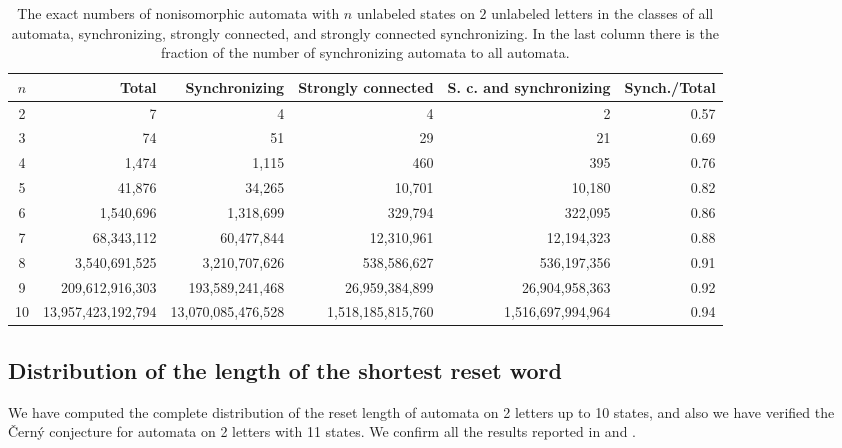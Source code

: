 \documentclass[runningheads,a4paper]{llncs}
\newcommand{\<}{\langle}
\renewcommand{\>}{\rangle}
\begin{document}
\begin{table}\label{tab:aut_counts_k2}
\centering
\caption{The exact numbers of nonisomorphic automata with $n$ unlabeled states on $2$ unlabeled letters in the classes of all automata, synchronizing, strongly connected, and strongly connected synchronizing. In the last column there is the fraction of the number of synchronizing automata to all automata.}
\begin{tabular}{|c|r|r|r|r|r|} \hline
$n$ & Total              & Synchronizing      & Strongly connected & S. c. and synchronizing & Synch./Total \\ \hline
2   &                  7 &                  4 &                  4 &                 2 & 0.57 \\ \hline
3   &                 74 &                 51 &                 29 &                21 & 0.69 \\ \hline
4   &              1,474 &              1,115 &                460 &               395 & 0.76 \\ \hline
5   &             41,876 &             34,265 &             10,701 &            10,180 & 0.82 \\ \hline
6   &          1,540,696 &          1,318,699 &            329,794 &           322,095 & 0.86 \\ \hline
7   &         68,343,112 &         60,477,844 &         12,310,961 &        12,194,323 & 0.88 \\ \hline
8   &      3,540,691,525 &      3,210,707,626 &        538,586,627 &       536,197,356 & 0.91 \\ \hline
9   &    209,612,916,303 &    193,589,241,468 &     26,959,384,899 &    26,904,958,363 & 0.92 \\ \hline
10  & 13,957,423,192,794 & 13,070,085,476,528 &  1,518,185,815,760 & 1,516,697,994,964 & 0.94 \\ \hline
\end{tabular}
\end{table}

\subsection{Distribution of the length of the shortest reset word}
We have computed the complete distribution of the reset length of automata on 2 letters up to 10 states, and also we have verified the \v{C}ern\'{y} conjecture for automata on 2 letters with 11 states. We confirm all the results reported in \cite{Tr2006} and \cite{AGV2010}.
\end{document}
